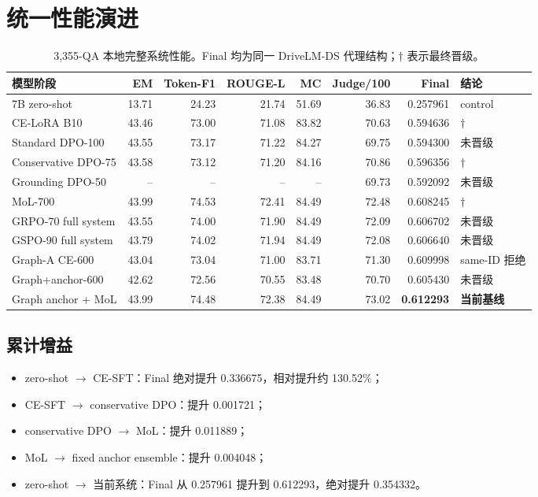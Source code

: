 \documentclass[UTF8,a4paper,11pt]{ctexart}
\begin{document}
\section{统一性能演进}
\begin{table}[H]
\centering
\caption{3,355-QA 本地完整系统性能。Final 均为同一 DriveLM-DS 代理结构；\(\dagger\) 表示最终晋级。}
\scriptsize
\begin{tabular}{p{2.5cm}rrrrrrp{1.55cm}}
\toprule
模型阶段 & EM & Token-F1 & ROUGE-L & MC & Judge/100 & Final & 结论\\
\midrule
7B zero-shot & 13.71 & 24.23 & 21.74 & 51.69 & 36.83 & 0.257961 & control\\
CE-LoRA B10 & 43.46 & 73.00 & 71.08 & 83.82 & 70.63 & 0.594636 & \(\dagger\)\\
Standard DPO-100 & 43.55 & 73.17 & 71.22 & 84.27 & 69.75 & 0.594300 & 未晋级\\
Conservative DPO-75 & 43.58 & 73.12 & 71.20 & 84.16 & 70.86 & 0.596356 & \(\dagger\)\\
Grounding DPO-50 & -- & -- & -- & -- & 69.73 & 0.592092 & 未晋级\\
MoL-700 & 43.99 & 74.53 & 72.41 & 84.49 & 72.48 & 0.608245 & \(\dagger\)\\
GRPO-70 full system & 43.55 & 74.00 & 71.90 & 84.49 & 72.09 & 0.606702 & 未晋级\\
GSPO-90 full system & 43.79 & 74.02 & 71.94 & 84.49 & 72.08 & 0.606640 & 未晋级\\
Graph-A CE-600 & 43.04 & 73.04 & 71.00 & 83.71 & 71.30 & 0.609998 & same-ID 拒绝\\
Graph+anchor-600 & 42.62 & 72.56 & 70.55 & 83.48 & 70.70 & 0.605430 & 未晋级\\
\rowcolor{LightGreen}
Graph anchor + MoL & 43.99 & 74.48 & 72.38 & 84.49 & 73.02 & \textbf{0.612293} & \textbf{当前基线}\\
\bottomrule
\end{tabular}
\end{table}

\subsection{累计增益}
\begin{itemize}
  \item zero-shot \(\rightarrow\) CE-SFT：Final 绝对提升 0.336675，相对提升约 130.52\%；
  \item CE-SFT \(\rightarrow\) conservative DPO：提升 0.001721；
  \item conservative DPO \(\rightarrow\) MoL：提升 0.011889；
  \item MoL \(\rightarrow\) fixed anchor ensemble：提升 0.004048；
  \item zero-shot \(\rightarrow\) 当前系统：Final 从 0.257961 提升到 0.612293，绝对提升 0.354332。
\end{itemize}
\end{document}
